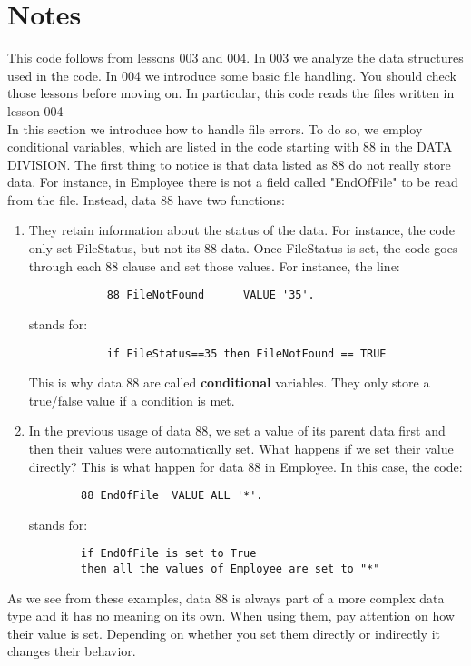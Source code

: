 \documentclass[letterpaper,12pt]{article}
\begin{document}
\section{Notes}
This code follows from lessons 003 and 004. In 003 we analyze the data structures used in the code. In 004 we introduce some basic file handling. You should check
those lessons before moving on. In particular, this code reads the files written in lesson 004\\
In this section we introduce how to handle file errors. To do so, we employ conditional variables, which are listed in the code starting with 88 in the DATA DIVISION.
The first thing to notice is that data listed as 88 do not really store data. For instance, in Employee there is not a field called "EndOfFile" to be read from the file.
Instead, data 88 have two functions:
\begin{enumerate}
    \item They retain information about the status of the data. For instance, the code only set FileStatus, but not its 88 data. 
        Once FileStatus is set, the code goes through each 88 clause and set those values. For instance, the line:
        \begin{verbatim}
            88 FileNotFound      VALUE '35'.    
        \end{verbatim}
        stands for:
        \begin{verbatim}
            if FileStatus==35 then FileNotFound == TRUE    
        \end{verbatim}
        This is why data 88 are called \textbf{conditional} variables. They  only store a true/false value if a condition is met.
    \item In the previous usage of data 88, we set a value of its parent data first and then their values were automatically set. What happens if we set their value directly?
        This is what happen for data 88 in Employee. In this case, the code:
        \begin{verbatim}
        88 EndOfFile  VALUE ALL '*'.               
        \end{verbatim}
        stands for:
        \begin{verbatim}
        if EndOfFile is set to True 
        then all the values of Employee are set to "*"
        \end{verbatim}
\end{enumerate}
As we see from these examples, data 88 is always part of a more complex data type and it has no meaning on its own. When using them, pay attention on how their value is set. 
Depending on whether you set them directly or indirectly it changes their behavior. 
\end{document}
